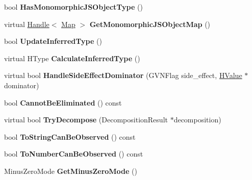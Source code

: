 \begin{DoxyCompactItemize}
\item 
\hypertarget{classv8_1_1internal_1_1_h_value_a69bd24f443ace9130981ce8b4242858d}{}bool {\bfseries Has\+Monomorphic\+J\+S\+Object\+Type} ()\label{classv8_1_1internal_1_1_h_value_a69bd24f443ace9130981ce8b4242858d}

\item 
\hypertarget{classv8_1_1internal_1_1_h_value_aa8abba867bf88874a71cfd1ed4850dfc}{}virtual \hyperlink{classv8_1_1internal_1_1_handle}{Handle}$<$ \hyperlink{classv8_1_1internal_1_1_map}{Map} $>$ {\bfseries Get\+Monomorphic\+J\+S\+Object\+Map} ()\label{classv8_1_1internal_1_1_h_value_aa8abba867bf88874a71cfd1ed4850dfc}

\item 
\hypertarget{classv8_1_1internal_1_1_h_value_a951602769c915fe79f0fc178499a5253}{}bool {\bfseries Update\+Inferred\+Type} ()\label{classv8_1_1internal_1_1_h_value_a951602769c915fe79f0fc178499a5253}

\item 
\hypertarget{classv8_1_1internal_1_1_h_value_a6b39baca39dad013ee37886610a0c607}{}virtual H\+Type {\bfseries Calculate\+Inferred\+Type} ()\label{classv8_1_1internal_1_1_h_value_a6b39baca39dad013ee37886610a0c607}

\item 
\hypertarget{classv8_1_1internal_1_1_h_value_afb16f5c1d149525102c04ac3a000a134}{}virtual bool {\bfseries Handle\+Side\+Effect\+Dominator} (G\+V\+N\+Flag side\+\_\+effect, \hyperlink{classv8_1_1internal_1_1_h_value}{H\+Value} $\ast$dominator)\label{classv8_1_1internal_1_1_h_value_afb16f5c1d149525102c04ac3a000a134}

\item 
\hypertarget{classv8_1_1internal_1_1_h_value_a58c0f1cdea8c3265ba8c8b56733d15e6}{}bool {\bfseries Cannot\+Be\+Eliminated} () const \label{classv8_1_1internal_1_1_h_value_a58c0f1cdea8c3265ba8c8b56733d15e6}

\item 
\hypertarget{classv8_1_1internal_1_1_h_value_a1695e8ff4cfb8b95b46c0eb87d3dfcea}{}virtual bool {\bfseries Try\+Decompose} (Decomposition\+Result $\ast$decomposition)\label{classv8_1_1internal_1_1_h_value_a1695e8ff4cfb8b95b46c0eb87d3dfcea}

\item 
\hypertarget{classv8_1_1internal_1_1_h_value_ad189dd3a2fbe2d9a7060fd1c1ad60383}{}bool {\bfseries To\+String\+Can\+Be\+Observed} () const \label{classv8_1_1internal_1_1_h_value_ad189dd3a2fbe2d9a7060fd1c1ad60383}

\item 
\hypertarget{classv8_1_1internal_1_1_h_value_aa6c1b49667bd5017b60e4f27b17c6ab2}{}bool {\bfseries To\+Number\+Can\+Be\+Observed} () const \label{classv8_1_1internal_1_1_h_value_aa6c1b49667bd5017b60e4f27b17c6ab2}

\item 
\hypertarget{classv8_1_1internal_1_1_h_value_a14b7f5ed562f405f6727d8109426c5ab}{}Minus\+Zero\+Mode {\bfseries Get\+Minus\+Zero\+Mode} ()\label{classv8_1_1internal_1_1_h_value_a14b7f5ed562f405f6727d8109426c5ab}

\end{DoxyCompactItemize}
